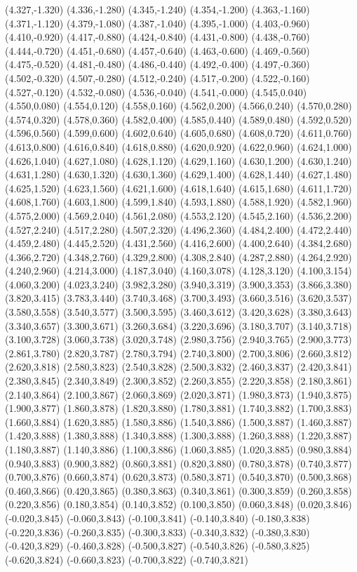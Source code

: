 (4.327,-1.320) (4.336,-1.280) (4.345,-1.240) (4.354,-1.200) (4.363,-1.160) (4.371,-1.120) (4.379,-1.080) (4.387,-1.040) (4.395,-1.000) (4.403,-0.960) (4.410,-0.920) (4.417,-0.880) (4.424,-0.840) (4.431,-0.800) (4.438,-0.760) (4.444,-0.720) (4.451,-0.680) (4.457,-0.640) (4.463,-0.600) (4.469,-0.560) (4.475,-0.520) (4.481,-0.480) (4.486,-0.440) (4.492,-0.400) (4.497,-0.360) (4.502,-0.320) (4.507,-0.280) (4.512,-0.240) (4.517,-0.200) (4.522,-0.160) (4.527,-0.120) (4.532,-0.080) (4.536,-0.040) (4.541,-0.000) (4.545,0.040) (4.550,0.080) (4.554,0.120) (4.558,0.160) (4.562,0.200) (4.566,0.240) (4.570,0.280) (4.574,0.320) (4.578,0.360) (4.582,0.400) (4.585,0.440) (4.589,0.480) (4.592,0.520) (4.596,0.560) (4.599,0.600) (4.602,0.640) (4.605,0.680) (4.608,0.720) (4.611,0.760) (4.613,0.800) (4.616,0.840) (4.618,0.880) (4.620,0.920) (4.622,0.960) (4.624,1.000) (4.626,1.040) (4.627,1.080) (4.628,1.120) (4.629,1.160) (4.630,1.200) (4.630,1.240) (4.631,1.280) (4.630,1.320) (4.630,1.360) (4.629,1.400) (4.628,1.440) (4.627,1.480) (4.625,1.520) (4.623,1.560) (4.621,1.600) (4.618,1.640) (4.615,1.680) (4.611,1.720) (4.608,1.760) (4.603,1.800) (4.599,1.840) (4.593,1.880) (4.588,1.920) (4.582,1.960) (4.575,2.000) (4.569,2.040) (4.561,2.080) (4.553,2.120) (4.545,2.160) (4.536,2.200) (4.527,2.240) (4.517,2.280) (4.507,2.320) (4.496,2.360) (4.484,2.400) (4.472,2.440) (4.459,2.480) (4.445,2.520) (4.431,2.560) (4.416,2.600) (4.400,2.640) (4.384,2.680) (4.366,2.720) (4.348,2.760) (4.329,2.800) (4.308,2.840) (4.287,2.880) (4.264,2.920) (4.240,2.960) (4.214,3.000) (4.187,3.040) (4.160,3.078) (4.128,3.120) (4.100,3.154) (4.060,3.200) (4.023,3.240) (3.982,3.280) (3.940,3.319) (3.900,3.353) (3.866,3.380) (3.820,3.415) (3.783,3.440) (3.740,3.468) (3.700,3.493) (3.660,3.516) (3.620,3.537) (3.580,3.558) (3.540,3.577) (3.500,3.595) (3.460,3.612) (3.420,3.628) (3.380,3.643) (3.340,3.657) (3.300,3.671) (3.260,3.684) (3.220,3.696) (3.180,3.707) (3.140,3.718) (3.100,3.728) (3.060,3.738) (3.020,3.748) (2.980,3.756) (2.940,3.765) (2.900,3.773) (2.861,3.780) (2.820,3.787) (2.780,3.794) (2.740,3.800) (2.700,3.806) (2.660,3.812) (2.620,3.818) (2.580,3.823) (2.540,3.828) (2.500,3.832) (2.460,3.837) (2.420,3.841) (2.380,3.845) (2.340,3.849) (2.300,3.852) (2.260,3.855) (2.220,3.858) (2.180,3.861) (2.140,3.864) (2.100,3.867) (2.060,3.869) (2.020,3.871) (1.980,3.873) (1.940,3.875) (1.900,3.877) (1.860,3.878) (1.820,3.880) (1.780,3.881) (1.740,3.882) (1.700,3.883) (1.660,3.884) (1.620,3.885) (1.580,3.886) (1.540,3.886) (1.500,3.887) (1.460,3.887) (1.420,3.888) (1.380,3.888) (1.340,3.888) (1.300,3.888) (1.260,3.888) (1.220,3.887) (1.180,3.887) (1.140,3.886) (1.100,3.886) (1.060,3.885) (1.020,3.885) (0.980,3.884) (0.940,3.883) (0.900,3.882) (0.860,3.881) (0.820,3.880) (0.780,3.878) (0.740,3.877) (0.700,3.876) (0.660,3.874) (0.620,3.873) (0.580,3.871) (0.540,3.870) (0.500,3.868) (0.460,3.866) (0.420,3.865) (0.380,3.863) (0.340,3.861) (0.300,3.859) (0.260,3.858) (0.220,3.856) (0.180,3.854) (0.140,3.852) (0.100,3.850) (0.060,3.848) (0.020,3.846) (-0.020,3.845) (-0.060,3.843) (-0.100,3.841) (-0.140,3.840) (-0.180,3.838) (-0.220,3.836) (-0.260,3.835) (-0.300,3.833) (-0.340,3.832) (-0.380,3.830) (-0.420,3.829) (-0.460,3.828) (-0.500,3.827) (-0.540,3.826) (-0.580,3.825) (-0.620,3.824) (-0.660,3.823) (-0.700,3.822) (-0.740,3.821) 